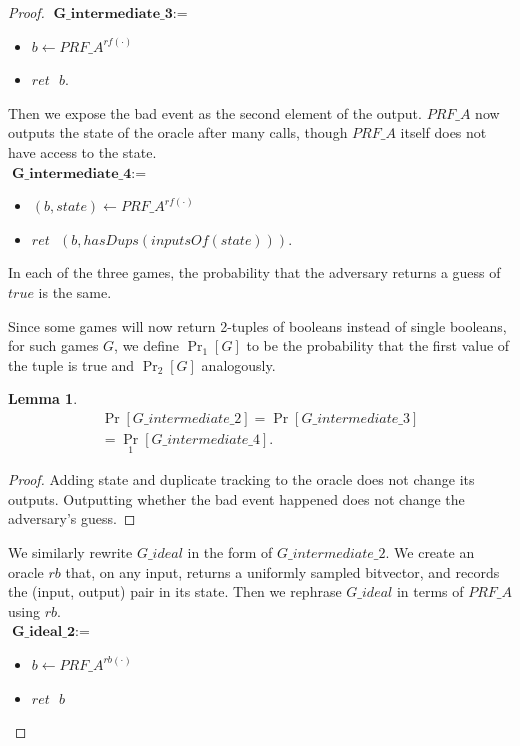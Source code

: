 \documentclass[12pt,lot, lof]{puthesis}
\newenvironment{game}
{ \begin{itemize}[noitemsep,nolistsep] 
}
{ \end{itemize}                  }
\newcommand{\s} {\textrm{ }}
\newtheorem{lem}{Lemma}[thm]
\begin{document}
{\begin{proof}
$\textbf{G\_intermediate\_3} := $
\begin{game}
\item[] $b \leftarrow PRF\_A^{rf(\cdot)}$ 
\item[] $ret \s b.$ \\
\end{game}

Then we expose the bad event as the second element of the output. $PRF\_A$ now outputs the state of the oracle after many calls, though $PRF\_A$ itself does not have access to the state. \\

$\textbf{G\_intermediate\_4} := $
\begin{game}
\item[] $(b, state) \leftarrow PRF\_A^{rf(\cdot)}$ 
\item[] $ret \s (b, hasDups(inputsOf(state))).$ \\
\end{game}

In each of the three games, the probability that the adversary returns a guess of $true$ is the same.

Since some games will now return 2-tuples of booleans instead of single booleans, for such games $G$, we define $\Pr_1[G]$ to be the probability that the first value of the tuple is true and $\Pr_2[G]$ analogously.

\begin{lem} \begin{gather*}\Pr[G\_intermediate\_2] = \Pr[G\_intermediate\_3] \\ 
= \Pr_1[G\_intermediate\_4].\end{gather*} \end{lem}
\begin{proof}Adding state and duplicate tracking to the oracle does not change its outputs. Outputting whether the bad event happened does not change the adversary's guess. \end{proof}

We similarly rewrite $G\_ideal$ in the form of $G\_intermediate\_2$. We create an oracle $rb$ that, on any input, returns a uniformly sampled bitvector, and records the (input, output) pair in its state. Then we rephrase $G\_ideal$ in terms of $PRF\_A$ using $rb$.\\

$\textbf{G\_ideal\_2} := $
\begin{game}
\item[] $b \leftarrow PRF\_A^{rb(\cdot)}$ 
\item[] $ret \s b$ \\
\end{game}


\end{proof}}
\end{document}
